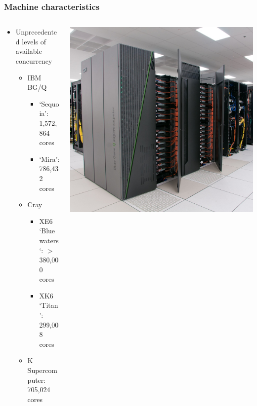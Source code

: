 \begin{frame}[fragile]
  \frametitle{Machine characteristics}
  \begin{columns}
    \begin{column}{0.55\textwidth}
      \begin{itemize}
      \item Unprecedented levels of available concurrency
        \begin{itemize}
        \item IBM BG/Q
          \begin{itemize}
          \item `Sequoia': 1,572,864 cores
          \item `Mira': 786,432 cores
          \end{itemize}
        \item Cray
          \begin{itemize}
          \item XE6 `Bluewaters`: $>$ 380,000 cores
          \item XK6 `Titan': 299,008 cores
          \end{itemize}
        \item K Supercomputer: 705,024 cores
        \end{itemize}
      \end{itemize}
    \end{column}
    \begin{column}{0.45\textwidth}
      \includegraphics[width=1\textwidth]{figures/mira.jpg}
    \end{column}
  \end{columns}
\end{frame}

